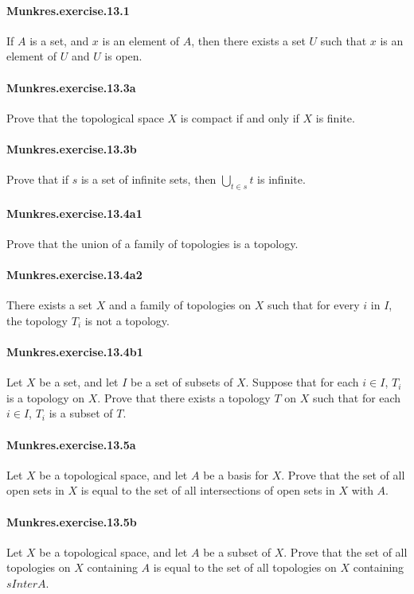 \documentclass{article}
\begin{document}
\paragraph{Munkres.exercise.13.1} If $A$ is a set, and $x$ is an element of $A$, then there exists a set $U$ such that $x$ is an element of $U$ and $U$ is open.

\paragraph{Munkres.exercise.13.3a} Prove that the topological space $X$ is compact if and only if $X$ is finite.

\paragraph{Munkres.exercise.13.3b} Prove that if $s$ is a set of infinite sets, then $\bigcup_{t\in s} t$ is infinite.

\paragraph{Munkres.exercise.13.4a1} Prove that the union of a family of topologies is a topology.

\paragraph{Munkres.exercise.13.4a2} There exists a set $X$ and a family of topologies on $X$ such that for every $i$ in $I$, the topology $T_i$ is not a topology.

\paragraph{Munkres.exercise.13.4b1} Let $X$ be a set, and let $I$ be a set of subsets of $X$. Suppose that for each $i \in I$, $T_i$ is a topology on $X$. Prove that there exists a topology $T$ on $X$ such that for each $i \in I$, $T_i$ is a subset of $T$.

\paragraph{Munkres.exercise.13.5a} Let $X$ be a topological space, and let $A$ be a basis for $X$. Prove that the set of all open sets in $X$ is equal to the set of all intersections of open sets in $X$ with $A$.

\paragraph{Munkres.exercise.13.5b} Let $X$ be a topological space, and let $A$ be a subset of $X$. Prove that the set of all topologies on $X$ containing $A$ is equal to the set of all topologies on $X$ containing $sInter A$.
\end{document}
